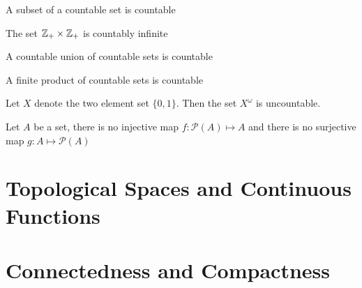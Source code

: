 \begin{corollary}
A subset of a countable set is countable
\end{corollary}

\begin{corollary}
The set $\mathbb{Z}_+ \times \mathbb{Z}_+$ is countably infinite
\end{corollary}

\begin{theorem}
A countable union of countable sets is countable
\end{theorem}

\begin{theorem}
A finite product of countable sets is countable
\end{theorem}

\begin{theorem}
Let $X$ denote the two element set $\{0, 1\}$. Then the set $X^{\omega}$ is uncountable.
\end{theorem}

\begin{theorem}
Let $A$ be a set, there is no injective map $f: \mathcal{P}(A) \mapsto A$ and there is no surjective map $g: A \mapsto \mathcal{P}(A)$
\end{theorem}



\section{Topological Spaces and Continuous Functions}

\section{Connectedness and Compactness}
